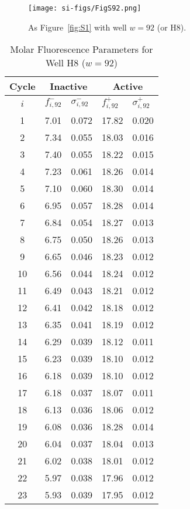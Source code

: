                 \begin{figure}
                    \centering
                    \texttt{[image: si-figs/FigS92.png]}
                    \caption{
                        As Figure~\ref{fig:S1} with well $w=92$ (or H8).
                    }
                \end{figure}
                \clearpage
    \begin{table}
        \caption{Molar Fluorescence Parameters for Well H8 ($w=92$)}
        \centering
        \begin{tabular}{c|ll|ll}
            Cycle & \multicolumn{2}{c|}{Inactive} & \multicolumn{2}{c}{Active} \\
            \hline
            $i$ & $f_{i,92}^{-}$ & $\sigma_{i,92}^{-}$ &  $f_{i,92}^{+}$ & $\sigma_{i,92}^{+}$ \\
            \hline
    1 & 7.01 & 0.072 & 17.82 & 0.020 \\
2 & 7.34 & 0.055 & 18.03 & 0.016 \\
3 & 7.40 & 0.055 & 18.22 & 0.015 \\
4 & 7.23 & 0.061 & 18.26 & 0.014 \\
5 & 7.10 & 0.060 & 18.30 & 0.014 \\
6 & 6.95 & 0.057 & 18.28 & 0.014 \\
7 & 6.84 & 0.054 & 18.27 & 0.013 \\
8 & 6.75 & 0.050 & 18.26 & 0.013 \\
9 & 6.65 & 0.046 & 18.23 & 0.012 \\
10 & 6.56 & 0.044 & 18.24 & 0.012 \\
11 & 6.49 & 0.043 & 18.21 & 0.012 \\
12 & 6.41 & 0.042 & 18.18 & 0.012 \\
13 & 6.35 & 0.041 & 18.19 & 0.012 \\
14 & 6.29 & 0.039 & 18.12 & 0.011 \\
15 & 6.23 & 0.039 & 18.10 & 0.012 \\
16 & 6.18 & 0.039 & 18.10 & 0.012 \\
17 & 6.18 & 0.037 & 18.07 & 0.011 \\
18 & 6.13 & 0.036 & 18.06 & 0.012 \\
19 & 6.08 & 0.036 & 18.28 & 0.014 \\
20 & 6.04 & 0.037 & 18.04 & 0.013 \\
21 & 6.02 & 0.038 & 18.01 & 0.012 \\
22 & 5.97 & 0.038 & 17.96 & 0.012 \\
23 & 5.93 & 0.039 & 17.95 & 0.012 \\

\end{tabular}
\end{table}
